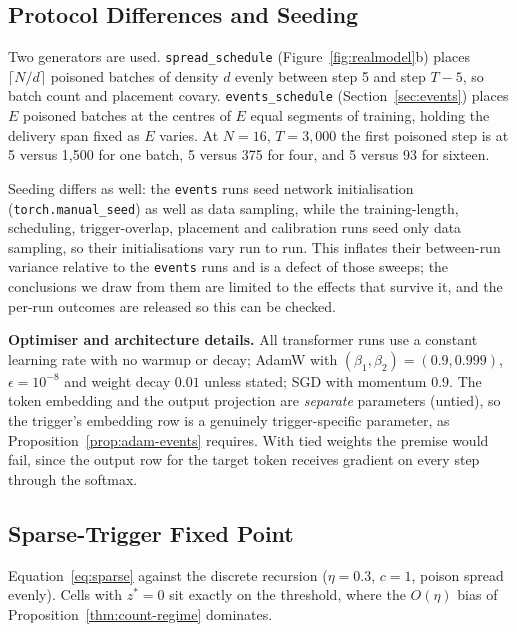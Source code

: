 \documentclass{article} %
\begin{document}
\subsection{Protocol Differences and Seeding}
\label{app:protocol}

Two generators are used. \texttt{spread\_schedule} (Figure~\ref{fig:realmodel}b) places
$\lceil N/d\rceil$ poisoned batches of density $d$ evenly between step 5 and step $T-5$,
so batch count and placement covary. \texttt{events\_schedule}
(Section~\ref{sec:events}) places $E$ poisoned batches at the centres of $E$ equal
segments of training, holding the delivery span fixed as $E$ varies. At $N=16$,
$T=3{,}000$ the first poisoned step is at 5 versus 1{,}500 for one batch, 5 versus 375
for four, and 5 versus 93 for sixteen.

Seeding differs as well: the \texttt{events} runs seed network initialisation
(\texttt{torch.manual\_seed}) as well as data sampling, while the training-length,
scheduling, trigger-overlap, placement and calibration runs seed only data sampling, so
their initialisations vary run to run. This inflates their between-run variance relative
to the \texttt{events} runs and is a defect of those sweeps; the conclusions we draw
from them are limited to the effects that survive it, and the per-run outcomes are
released so this can be checked.

\textbf{Optimiser and architecture details.} All transformer runs use a constant
learning rate with no warmup or decay; AdamW with $(\beta_1,\beta_2)=(0.9,0.999)$,
$\epsilon=10^{-8}$ and weight decay $0.01$ unless stated; SGD with momentum $0.9$. The
token embedding and the output projection are \emph{separate} parameters (untied), so
the trigger's embedding row is a genuinely trigger-specific parameter, as
Proposition~\ref{prop:adam-events} requires. With tied weights the premise would fail,
since the output row for the target token receives gradient on every step through the
softmax.

\subsection{Sparse-Trigger Fixed Point}
\label{app:sparse}

Equation~\ref{eq:sparse} against the discrete recursion
($\eta=0.3$, $c=1$, poison spread evenly). Cells with $z^*=0$ sit exactly on the
threshold, where the $O(\eta)$ bias of Proposition~\ref{thm:count-regime} dominates.
\end{document}
